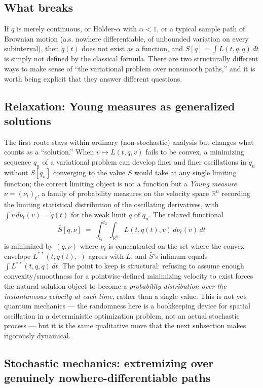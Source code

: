 \documentclass[11pt]{article}
\newcommand{\R}{\mathbb{R}}
\begin{document}
\subsection{What breaks}

If $q$ is merely continuous, or H\"older-$\alpha$ with $\alpha<1$, or a typical sample path of Brownian motion (a.s. nowhere differentiable, of unbounded variation on every subinterval), then $\dot q(t)$ does not exist as a function, and $S[q]=\int L(t,q,\dot q)\,dt$ is simply not defined by the classical formula. There are two structurally different ways to make sense of ``the variational problem over nonsmooth paths,'' and it is worth being explicit that they answer different questions.

\subsection{Relaxation: Young measures as generalized solutions}

The first route stays within ordinary (non-stochastic) analysis but changes what counts as a ``solution.'' When $v\mapsto L(t,q,v)$ fails to be convex, a minimizing sequence $q_n$ of a variational problem can develop finer and finer oscillations in $\dot q_n$ without $S[q_n]$ converging to the value $S$ would take at any single limiting function; the correct limiting object is not a function but a \emph{Young measure} $\nu=(\nu_t)_{t}$, a family of probability measures on the velocity space $\R^n$ recording the limiting statistical distribution of the oscillating derivatives, with $\int v\,d\nu_t(v)=\dot q(t)$ for the weak limit $q$ of $q_n$. The relaxed functional
\[
\bar S[q,\nu] \;=\; \int_{t_1}^{t_2}\!\! \int_{\R^n} L(t,q(t),v)\, d\nu_t(v)\, dt
\]
is minimized by $(q,\nu)$ where $\nu_t$ is concentrated on the set where the convex envelope $L^{\ast\ast}(t,q(t),\cdot)$ agrees with $L$, and $\bar S$'s infimum equals $\int L^{\ast\ast}(t,q,\dot q)\,dt$. The point to keep is structural: refusing to assume enough convexity/smoothness for a pointwise-defined minimizing velocity to exist forces the natural solution object to become a \emph{probability distribution over the instantaneous velocity at each time}, rather than a single value. This is not yet quantum mechanics --- the randomness here is a bookkeeping device for spatial oscillation in a deterministic optimization problem, not an actual stochastic process --- but it is the same qualitative move that the next subsection makes rigorously dynamical.

\subsection{Stochastic mechanics: extremizing over genuinely nowhere-differentiable paths}
\label{subsec:nelson}
\end{document}
